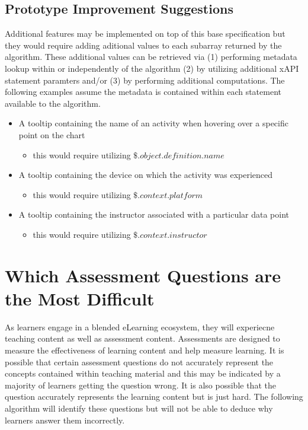 \documentclass{article}
\begin{document}
\subsection{Prototype Improvement Suggestions}
Additional features may be implemented on top of this base
specification but they would require adding aditional values to each
subarray returned by the algorithm. These additional values can be
retrieved via (1) performing metadata lookup within or independently of the
algorithm (2) by utilizing additional xAPI statement paramters and/or (3) by
performing additional computations. The following examples assume the
metadata is contained within each statement available to the algorithm.
\begin{itemize}
\item A tooltip containing the name of an activity when hovering
  over a specific point on the chart
  \begin{itemize}
    \item this would require utilizing $\$.object.definition.name$
  \end{itemize}
\item A tooltip containing the device on which the activity was experienced
  \begin{itemize}
    \item this would require utilizing $\$.context.platform$
  \end{itemize}
\item A tooltip containing the instructor associated with a
  particular data point
  \begin{itemize}
    \item this would require utilizing $\$.context.instructor$
  \end{itemize}
\end{itemize}

\section{Which Assessment Questions are the Most Difficult}
As learners engage in a blended eLearning ecosystem, they will
experiecne teaching content as well as assessment content. Assessments
are designed to measure the effectiveness of learning content and help
measure learning. It is possible that certain assessment questions
do not accurately represent the concepts contained within teaching
material and this may be indicated by a majority of learners getting
the question wrong. It is also possible that the question accurately
represents the learning content but is just hard. The following
algorithm will identify these questions but will not be able to deduce
why learners answer them incorrectly.
\end{document}
